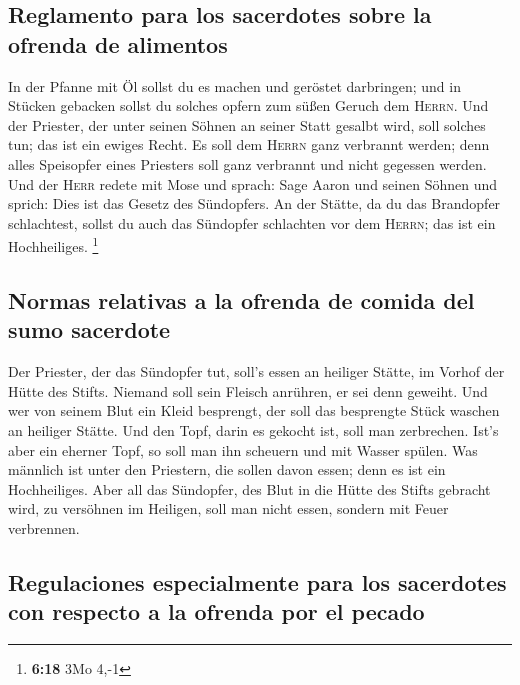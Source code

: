 \hypertarget{reglamento-para-los-sacerdotes-sobre-la-ofrenda-de-alimentos}{%
\subsection{Reglamento para los sacerdotes sobre la ofrenda de
alimentos}\label{reglamento-para-los-sacerdotes-sobre-la-ofrenda-de-alimentos}}

 In der Pfanne mit Öl sollst du es machen und geröstet
darbringen; und in Stücken gebacken sollst du solches opfern zum süßen
Geruch dem \textsc{Herrn}.  Und der Priester, der unter
seinen Söhnen an seiner Statt gesalbt wird, soll solches tun; das ist
ein ewiges Recht. Es soll dem \textsc{Herrn} ganz verbrannt werden;
 denn alles Speisopfer eines Priesters soll ganz
verbrannt und nicht gegessen werden.  Und der
\textsc{Herr} redete mit Mose und sprach:  Sage Aaron und
seinen Söhnen und sprich: Dies ist das Gesetz des Sündopfers. An der
Stätte, da du das Brandopfer schlachtest, sollst du auch das Sündopfer
schlachten vor dem \textsc{Herrn}; das ist ein Hochheiliges. \footnote{\textbf{6:18}
  3Mo 4,-1}

\hypertarget{normas-relativas-a-la-ofrenda-de-comida-del-sumo-sacerdote}{%
\subsection{Normas relativas a la ofrenda de comida del sumo
sacerdote}\label{normas-relativas-a-la-ofrenda-de-comida-del-sumo-sacerdote}}

 Der Priester, der das Sündopfer tut, soll's essen an
heiliger Stätte, im Vorhof der Hütte des Stifts.  Niemand
soll sein Fleisch anrühren, er sei denn geweiht. Und wer von seinem Blut
ein Kleid besprengt, der soll das besprengte Stück waschen an heiliger
Stätte.  Und den Topf, darin es gekocht ist, soll man
zerbrechen. Ist's aber ein eherner Topf, so soll man ihn scheuern und
mit Wasser spülen.  Was männlich ist unter den Priestern,
die sollen davon essen; denn es ist ein Hochheiliges. 
Aber all das Sündopfer, des Blut in die Hütte des Stifts gebracht wird,
zu versöhnen im Heiligen, soll man nicht essen, sondern mit Feuer
verbrennen.

\hypertarget{regulaciones-especialmente-para-los-sacerdotes-con-respecto-a-la-ofrenda-por-el-pecado}{%
\subsection{Regulaciones especialmente para los sacerdotes con respecto
a la ofrenda por el
pecado}\label{regulaciones-especialmente-para-los-sacerdotes-con-respecto-a-la-ofrenda-por-el-pecado}}

